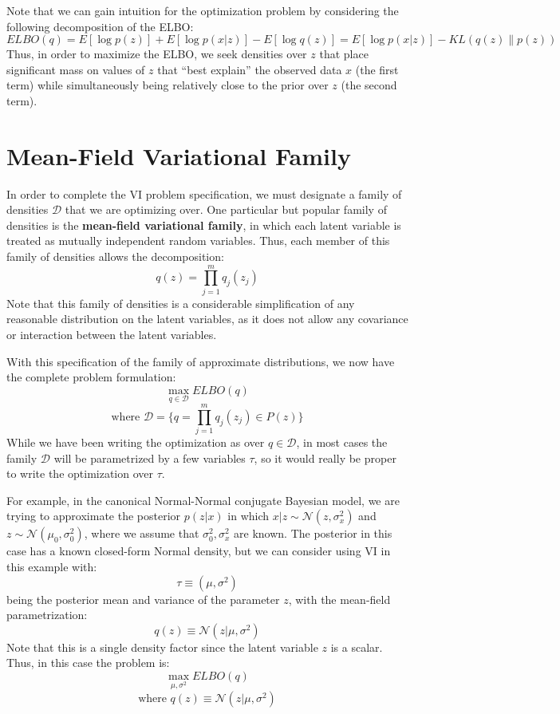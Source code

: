\documentclass[psamsfonts]{amsart}
\theoremstyle{definition}
\theoremstyle{remark}
\numberwithin{equation}{section}
\begin{document}
Note that we can gain intuition for the optimization problem by considering the following decomposition of the ELBO:
$$ELBO(q) = E[\log p(z)] + E[\log p(x|z)] - E[\log q(z)] = E[\log p(x|z)] - KL(q(z)\| p(z))$$
Thus, in order to maximize the ELBO, we seek densities over $z$ that place significant mass on values of $z$ that ``best explain'' the observed data $x$ (the first term) while simultaneously being relatively close to the prior over $z$ (the second term).

\section{Mean-Field Variational Family}

In order to complete the VI problem specification, we must designate a family of densities $\mathcal{D}$ that we are optimizing over. One particular but popular family of densities is the {\bf mean-field variational family}, in which each latent variable is treated as mutually independent random variables. Thus, each member of this family of densities allows the decomposition:
$$q(z) = \prod_{j=1}^m q_j(z_j)$$
Note that this family of densities is a considerable simplification of any reasonable distribution on the latent variables, as it does not allow any covariance or interaction between the latent variables.

With this specification of the family of approximate distributions, we now have the complete problem formulation:
$$\max_{q\in \mathcal{D}} ELBO(q)$$
$$\text{where } \mathcal{D} = \{ q = \prod_{j=1}^m q_j(z_j) \in P(z) \}$$
While we have been writing the optimization as over $q\in \mathcal{D}$, in most cases the family $\mathcal{D}$ will be parametrized by a few variables $\tau$, so it would really be proper to write the optimization over $\tau$.

For example, in the canonical Normal-Normal conjugate Bayesian model, we are trying to approximate the posterior $p(z|x)$ in which $x|z \sim \mathcal{N}(z, \sigma_x^2)$ and $z \sim \mathcal{N}(\mu_0, \sigma_0^2)$, where we assume that $\sigma_0^2, \sigma_x^2$ are known. The posterior in this case has a known closed-form Normal density, but we can consider using VI in this example with:
$$\tau \equiv (\mu, \sigma^2)$$
being the posterior mean and variance of the parameter $z$, with the mean-field parametrization:
$$q(z) \equiv  \mathcal{N}(z|\mu, \sigma^2)$$
Note that this is a single density factor since the latent variable $z$ is a scalar. Thus, in this case the problem is:
$$\max_{\mu, \sigma^2} ELBO(q)$$
$$\text{where } q(z) \equiv \mathcal{N}(z|\mu, \sigma^2)$$
\end{document}
